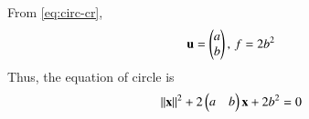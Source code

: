 	From \eqref{eq:circ-cr},
\begin{align}
	\mathbf{u} &= \begin{pmatrix}a\\b\end{pmatrix},\,
	f  
	  =2b^2
\end{align}
Thus, the equation of circle is 
\begin{align}
	\left\lVert\mathbf{x}\right\rVert^2 +2 \begin{pmatrix}a&b\end{pmatrix}\mathbf{x}+2b^2 &= 0       		       
\end{align}	
